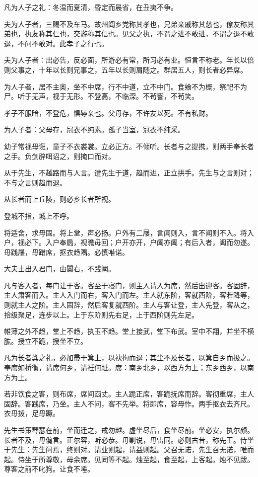 \documentclass[]{article}
\begin{document}
凡为人子之礼：冬温而夏清，昏定而晨省，在丑夷不争。

夫为人子者，三赐不及车马。故州闾乡党称其孝也，兄弟亲戚称其慈也，僚友称其弟也，执友称其仁也，交游称其信也。见父之执，不谓之进不敢进，不谓之退不敢退，不问不敢对。此孝子之行也。

夫为人子者：出必告，反必面，所游必有常，所习必有业。恒言不称老。年长以倍则父事之，十年以长则兄事之，五年以长则肩随之。群居五人，则长者必异席。

为人子者，居不主奥，坐不中席，行不中道，立不中门。食飨不为概，祭祀不为尸。听于无声，视于无形。不登高，不临深。不茍訾，不茍笑。

孝子不服暗，不登危，惧辱亲也。父母存，不许友以死。不有私财。

为人子者：父母存，冠衣不纯素。孤子当室，冠衣不纯采。

幼子常视毋诳，童子不衣裘裳。立必正方。不倾听。长者与之提携，则两手奉长者之手。负剑辟咡诏之，则掩口而对。

从于先生，不越路而与人言。遭先生于道，趋而进，正立拱手。先生与之言则对；不与之言则趋而退。

从长者而上丘陵，则必乡长者所视。

登城不指，城上不呼。

将适舍，求毋固。将上堂，声必扬。户外有二屦，言闻则入，言不闻则不入。将入户，视必下。入户奉扃，视瞻毋回；户开亦开，户阖亦阖；有后入者，阖而勿遂。毋践屦，毋踖席，抠衣趋隅。必慎唯诺。

大夫士出入君门，由闑右，不践阈。

凡与客入者，每门让于客。客至于寝门，则主人请入为席，然后出迎客。客固辞，主人肃客而入。主人入门而右，客入门而左。主人就东阶，客就西阶，客若降等，则就主人之阶。主人固辞，然后客复就西阶。主人与客让登，主人先登，客从之，拾级聚足，连步以上。上于东阶则先右足，上于西阶则先左足。

帷薄之外不趋，堂上不趋，执玉不趋。堂上接武，堂下布武。室中不翔，并坐不横肱。授立不跪，授坐不立。

凡为长者粪之礼，必加帚于箕上，以袂拘而退；其尘不及长者，以箕自乡而扱之。奉席如桥衡，请席何乡，请衽何趾。席：南乡北乡，以西方为上；东乡西乡，以南方为上。

若非饮食之客，则布席，席间函丈。主人跪正席，客跪抚席而辞。客彻重席，主人固辞。客践席，乃坐。主人不问，客不先举。将即席，容毋怍。两手抠衣去齐尺。衣毋拨，足毋蹶。

先生书策琴瑟在前，坐而迁之，戒勿越。虚坐尽后，食坐尽前。坐必安，执尔颜。长者不及，毋儳言。正尔容，听必恭。毋剿说，毋雷同。必则古昔，称先王。侍坐于先生：先生问焉，终则对。请业则起，请益则起。父召无诺，先生召无诺，唯而起。侍坐于所尊敬，毋余席。见同等不起。烛至起，食至起，上客起。烛不见跋。尊客之前不叱狗。让食不唾。
\end{document}
